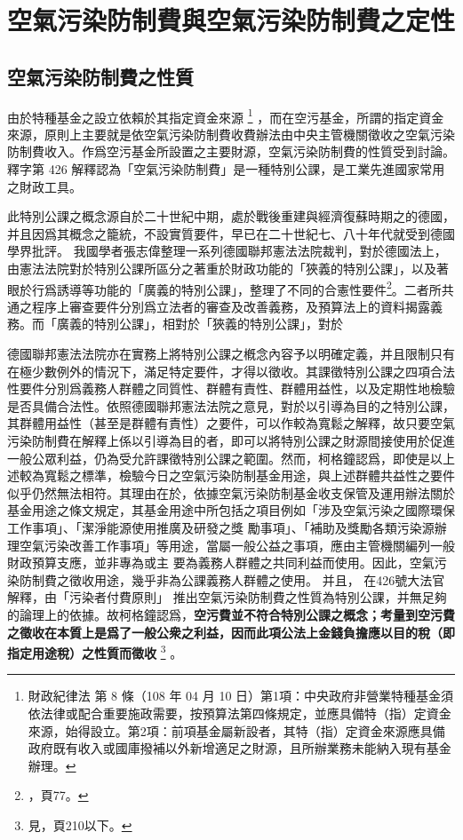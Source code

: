 \documentclass[12pt,a4paper]{article}
\begin{document}

\pagebreak

\section{空氣污染防制費與空氣污染防制費之定性}

\subsection{空氣污染防制費之性質}
由於特種基金之設立依賴於其指定資金來源
\footnote{財政紀律法 第 8 條（108 年 04 月 10 日）第1項：中央政府非營業特種基金須依法律或配合重要施政需要，按預算法第四條規定，並應具備特（指）定資金來源，始得設立。第2項：前項基金屬新設者，其特（指）定資金來源應具備政府既有收入或國庫撥補以外新增適足之財源，且所辦業務未能納入現有基金辦理。}
，而在空污基金，所謂的指定資金來源，原則上主要就是依空氣污染防制費收費辦法由中央主管機關徵收之空氣污染防制費收入。作爲空污基金所設置之主要財源，空氣污染防制費的性質受到討論。釋字第 426 解釋認為「空氣污染防制費」是一種特別公課，是工業先進國家常用之財政工具。

此特別公課之概念源自於二十世紀中期，處於戰後重建與經濟復蘇時期之的德國，并且因爲其概念之籠統，不設實質要件，早已在二十世紀七、八十年代就受到德國學界批評。
我國學者張志偉整理一系列德國聯邦憲法法院裁判，對於德國法上，由憲法法院對於特別公課所區分之著重於財政功能的「狹義的特別公課」，以及著眼於行爲誘導等功能的「廣義的特別公課」，整理了不同的合憲性要件\footnote{，頁77。}。二者所共通之程序上審查要件分別爲立法者的審查及改善義務，及預算法上的資料揭露義務。而「廣義的特別公課」，相對於「狹義的特別公課」，對於

德國聯邦憲法法院亦在實務上將特別公課之槪念內容予以明確定義，并且限制只有在極少數例外的情況下，滿足特定要件，才得以徵收。其課徵特別公課之四項合法性要件分別爲義務人群體之同質性、群體有責性、群體用益性，以及定期性地檢驗是否具備合法性。依照德國聯邦憲法法院之意見，對於以引導為目的之特別公課，其群體用益性（甚至是群體有責性）之要件，可以作較為寬鬆之解釋，故只要空氣污染防制費在解釋上係以引導為目的者，即可以將特別公課之財源間接使用於促進一般公眾利益，仍為受允許課徵特別公課之範圍。然而，柯格鐘認爲，即使是以上述較為寬鬆之標準，檢驗今日之空氣污染防制基金用途，與上述群體共益性之要件似乎仍然無法相符。其理由在於，依據空氣污染防制基金收支保管及運用辦法關於基金用途之條文規定，其基金用途中所包括之項目例如「涉及空氣污染之國際環保工作事項」、「潔淨能源使用推廣及研發之獎 勵事項」、「補助及獎勵各類污染源辦理空氣污染改善工作事項」等用途，當屬一般公益之事項，應由主管機關編列一般財政預算支應，並非專為或主 要為義務人群體之共同利益而使用。因此，空氣污染防制費之徵收用途，幾乎非為公課義務人群體之使用。
并且，
在426號大法官解釋，由「污染者付費原則」 推出空氣污染防制費之性質為特別公課，并無足夠的論理上的依據。故柯格鐘認爲，\textbf{空污費並不符合特別公課之概念；考量到空污費之徵收在本質上是爲了一般公衆之利益，因而此項公法上金錢負擔應以目的稅（即指定用途稅）之性質而徵收}
\footnote{見，頁210以下。}
。
\end{document}
